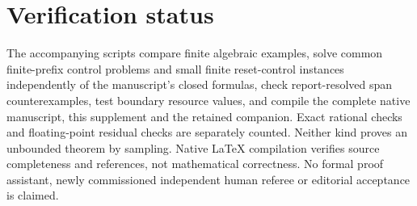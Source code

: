 \section{Verification status}
The accompanying scripts compare finite algebraic examples, solve common finite-prefix control problems and small finite reset-control instances independently of the manuscript's closed formulas, check report-resolved span counterexamples, test boundary resource values, and compile the complete native manuscript, this supplement and the retained companion. Exact rational checks and floating-point residual checks are separately counted. Neither kind proves an unbounded theorem by sampling. Native LaTeX compilation verifies source completeness and references, not mathematical correctness. No formal proof assistant, newly commissioned independent human referee or editorial acceptance is claimed.


